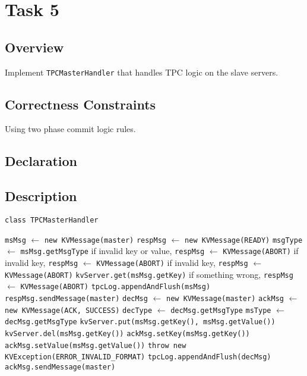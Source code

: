 \documentclass{article}
\begin{document}
\section{Task 5}
\subsection{Overview}
Implement \texttt{TPCMasterHandler} that handles TPC logic on the slave servers.
\subsection{Correctness Constraints}
\begin{compactitem}
	\item Using two phase commit logic rules.
\end{compactitem}
\subsection{Declaration}
\subsection{Description}
\begin{algorithm}
	\caption{\texttt{class TPCMasterHandler}}
	\begin{algorithmic}
			\State \texttt{msMsg} $\leftarrow$ \texttt{new KVMessage(master)}
			\State \texttt{respMsg} $\leftarrow$ \texttt{new KVMessage(READY)}
			\State \texttt{msgType} $\leftarrow$ \texttt{msMsg.getMsgType}
				\State if invalid key or value, \texttt{respMsg} $\leftarrow$ \texttt{KVMessage(ABORT)}
				\State if invalid key, \texttt{respMsg} $\leftarrow$ \texttt{KVMessage(ABORT)}
				\State if invalid key, \texttt{respMsg} $\leftarrow$ \texttt{KVMessage(ABORT)}
				\State \texttt{kvServer.get(msMsg.getKey)}
				\State if something wrong, \texttt{respMsg} $\leftarrow$ \texttt{KVMessage(ABORT)}
			\EndIf
			\State \texttt{tpcLog.appendAndFlush(msMsg)}
			\State \texttt{respMsg.sendMessage(master)}
			\State
			\State \texttt{decMsg} $\leftarrow$ \texttt{new KVMessage(master)}
			\State \texttt{ackMsg} $\leftarrow$ \texttt{new KVMessage(ACK, SUCCESS)}
			\State \texttt{decType} $\leftarrow$ \texttt{decMsg.getMsgType}
			\State \texttt{msType} $\leftarrow$ \texttt{decMsg.getMsgType}
					\State \texttt{kvServer.put(msMsg.getKey(), msMsg.getValue())}
					\State \texttt{kvServer.del(msMsg.getKey())}
					\State \texttt{ackMsg.setKey(msMsg.getKey())}
					\State \texttt{ackMsg.setValue(msMsg.getValue())}
				\EndIf
			\Else
				\State \texttt{throw new KVException(ERROR\_INVALID\_FORMAT)}
			\EndIf
			\State \texttt{tpcLog.appendAndFlush(decMsg)}
			\State \texttt{ackMsg.sendMessage(master)}
		\EndProcedure
	\end{algorithmic}
\end{algorithm}
\end{document}
